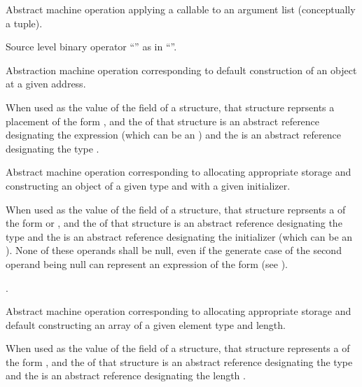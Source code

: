 Abstract machine operation applying a callable to an argument list (conceptually a tuple).

Source level binary operator ``\code{[]}'' as in ``''.

Abstraction machine operation corresponding to default construction of an object at a given address.

When used as the value of the  field of a  structure, 
that structure reprsents a placement  of the form , 
and the  of that structure is an abstract reference designating the expression  
(which can be an ) and the  is an abstract reference designating the type .


Abstract machine operation corresponding to allocating appropriate storage and constructing an object of a given type 
and with a given initializer.

When used as the value of the  field of a  structure, 
that structure reprsents a  of the form  or , 
and the  of that structure is an abstract reference designating the type  
and the  is an abstract reference designating the initializer 
(which can be an ).  None of these operands shall be null, even if the generate case
of the second operand being null can represent an expression of the form  
(see ).

.

Abstract machine operation corresponding to allocating appropriate storage and default constructing an array of a given element type and length. 

When used as the value of the  field of a  structure, 
that structure represents a  of the form , 
and the  of that structure is an abstract reference designating the type  
and the  is an abstract reference designating the length .

